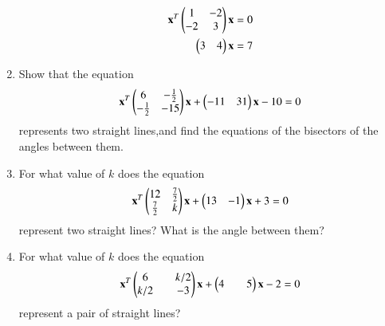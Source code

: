 \begin{enumerate}[label=\arabic*.,ref=\thesubsection.\theenumi]
\begin{align}
\mathbf{x}^T
\begin{pmatrix}1 & -{2}\\-{2} & 3\end{pmatrix} 
\mathbf{x} = 0
\\
\begin{pmatrix}3&4\end{pmatrix}\mathbf{x}=7
\end{align}
\renewcommand{\theequation}{\theenumi}
\item Show that the equation 
\begin{align}
    \mathbf{x}^T\begin{pmatrix}6&-\frac{1}{2}\\-\frac{1}{2}&-15\end{pmatrix}\mathbf{x}+\begin{pmatrix}-11& 31\end{pmatrix}\mathbf{x}-10=0\label{eq:solutions/2/6/22/eq:1}
\end{align}
represents two straight lines,and find the equations of the bisectors of the angles between them.
%
\\
\solution

\item For what value of $k$ does the equation
\begin{align}
\mathbf{x}^T
\begin{pmatrix}12 & \frac{7}{2}\\\frac{7}{2} & k\end{pmatrix} 
\mathbf{x} 
+\begin{pmatrix}13&-1\end{pmatrix}\mathbf{x}+3=0
\end{align}
represent two straight lines? What is the angle between them?

\item For what value of $k$ does the equation 
\begin{equation} \label{eq:solutions/2/6/24/eq:1.1}
\mathbf{x}^T \begin{pmatrix}6 && k/2 \\ k/2 && -3\end{pmatrix} \mathbf{x} + \begin{pmatrix}4 && 5\end{pmatrix}\mathbf{x} -2 = 0
\end{equation}
represent a pair of straight lines?
\\
\solution

%
\end{enumerate}
